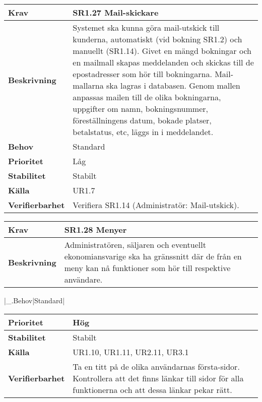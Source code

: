 \documentclass[a4paper, twoside, 11pt, titlepage]{article}
\begin{document}
	\begin{tabular} { p{2.6cm} p{12.5cm} }
		\hline
		\sffamily\textbf{Krav} & \sffamily\textbf{SR1.27 Mail-skickare } \\
		\hline
		\sffamily\textbf{Beskrivning} & Systemet ska kunna göra mail-utskick till kunderna, automatiskt (vid bokning SR1.2) och manuellt (SR1.14). Givet en mängd bokningar och en mailmall skapas meddelanden och skickas till de epostadresser som hör till bokningarna. Mail-mallarna ska lagras i databasen. Genom mallen anpassas mailen till de olika bokningarna, uppgifter om namn, bokningsnummer, föreställningens datum, bokade platser, betalstatus, etc, läggs in i meddelandet.  \\
		\hline
		\sffamily\textbf{Behov} & Standard  \\
		\hline
		\sffamily\textbf{Prioritet} & Låg  \\
		\hline
		\sffamily\textbf{Stabilitet} & Stabilt  \\
		\hline
		\sffamily\textbf{Källa} & UR1.7  \\
		\hline
		\sffamily\textbf{Verifierbarhet} & Verifiera SR1.14 (Administratör: Mail-utskick).  \\
		\hline
	\end{tabular}
	\vspace{6mm}

	\begin{tabular} { p{2.6cm} p{12.5cm} }
		\hline
		\sffamily\textbf{Krav} & \sffamily\textbf{SR1.28 Menyer } \\
		\hline
		\sffamily\textbf{Beskrivning} & Administratören, säljaren och eventuellt ekonomiansvarige ska ha gränssnitt där de från en meny kan nå funktioner som hör till respektive användare.  \\
		\hline
	\end{tabular}
	\vspace{6mm}

	|\_.Behov|Standard| 

	\begin{tabular} { p{2.6cm} p{12.5cm} }
		\hline
		\sffamily\textbf{Prioritet} & Hög  \\
		\hline
		\sffamily\textbf{Stabilitet} & Stabilt  \\
		\hline
		\sffamily\textbf{Källa} & UR1.10, UR1.11, UR2.11, UR3.1  \\
		\hline
		\sffamily\textbf{Verifierbarhet} & Ta en titt på de olika användarnas första-sidor. Kontrollera att det finns länkar till sidor för alla funktionerna och att dessa länkar pekar rätt.  \\
		\hline
	\end{tabular}
\end{document}
